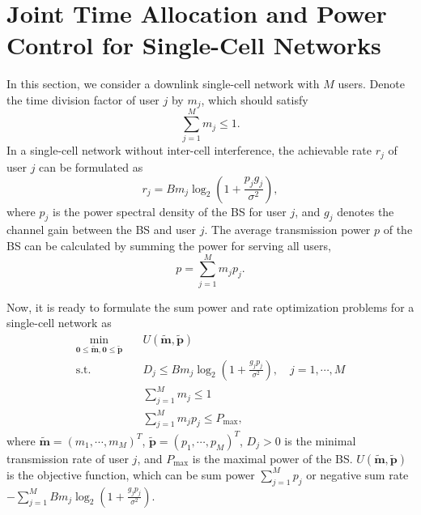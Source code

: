 \documentclass[journal]{IEEEtran}
\begin{document}
\section{Joint Time Allocation and Power Control for Single-Cell Networks}
In this section, we consider a downlink single-cell network with $M$ users.
Denote the time division factor of user $j$ by $m_j$, which should satisfy
\begin{equation}\label{1RBs_T_Constraint}
\sum_{j=1}^{M}m_j \leq 1.
\end{equation}
In a single-cell network without inter-cell interference, the achievable rate $r_j$ of user $j$ can be formulated as
\begin{equation}\label{2Bits_of_user}
r_j=B m_j \log_2\left(1+\frac{p_j g_j}{\sigma^2}\right),
\end{equation}
where $p_j$ is the power spectral density of the BS for user $j$, and $g_j$ denotes the channel gain between the BS and user $j$. %
The average transmission power $p$ of the BS can be calculated by summing the power for serving all users,
\begin{equation}\label{4Average_power_of_BS}
p=\sum_{j=1}^M m_j p_j.
\end{equation}

Now, it is ready to formulate the sum power and rate optimization problems for a single-cell network as
\begin{subequations}\label{OptimizationSingleCell_1}
\begin{align}
\mathop{\min}_{\pmb 0\leq \pmb{\tilde m}, \pmb 0 \leq \pmb{\tilde p}} \quad\!\!\!\!
&U({\pmb{\tilde m}, \pmb{\tilde p}})\\
\textrm{s.t.}\qquad   \!\!\!\!
& D_j \!\leq\!B m_j \log_2\left(\!1\!+\!\frac{g_j  p_j}{\sigma^2 }\!\right)\!,  \quad j \!=\!1, \cdots, M\\
&\sum_{j=1}^{M}m_j \leq 1\\
& {\sum_{j=1}^M m_j p_j} \leq P_{\max},
\end{align}
\end{subequations}
where $\pmb{\tilde m}=(m_1, \cdots, m_M)^T$, $ \pmb{\tilde p}=( p_1, \cdots, p_M)^T$, $D_j>0$ is the minimal transmission rate of user $j$,
and $P_{\max}$ is the maximal power of the BS.
$U({\pmb{\tilde m}, \pmb{\tilde p}})$ is the objective function, which can be sum power $\sum_{j=1}^M p_j$ or negative sum rate $-\sum_{j=1}^M B m_j \log_2\left(1+\frac{g_j  p_j}{\sigma^2 }\right)$.
\end{document}
